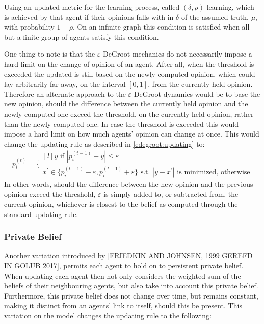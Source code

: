 \documentclass{article}
\newcommand{\beli}[3][2]{p_{#2}^{(#3)}}
\begin{document}
Using an updated metric for the learning process, called $(\delta, \rho)$-learning, which is achieved by that agent if their opinions falls with in $\delta$ of the assumed truth, $\mu$, with probability $1 - \rho$. On an infinite graph this condition is satisfied when all but a finite group of agents satisfy this condition. \newline

One thing to note is that the $\varepsilon$-DeGroot mechanics do not necessarily impose a hard limit on the change of opinion of an agent. After all, when the threshold is exceeded the updated is still based on the newly computed opinion, which could lay arbitrarily far away, on the interval $[0, 1]$, from the currently held opinion. Therefore an alternate approach to the $\varepsilon$-DeGroot dynamics would be to base the new opinion, should the difference between the currently held opinion and the newly computed one exceed the threshold, on the currently held opinion, rather than the 
newly computed one. In case the threshold is exceeded this would impose a hard limit on how much agents' opinion can change at once. This would change the updating rule as described in \ref{edegroot:updating} to:
\begin{equation*}
    \label{edegroot:alt}
    \beli{i}{t} =\Bigg\{
    \begin{matrix*}[l]
        y \text{ if } |\beli{i}{t-1} - y| \leq \varepsilon\\
        x^{\prime}\in\{\beli{i}{t-1}-\varepsilon, \beli{i}{t-1}+\varepsilon\}\text{ s.t. }|y - x^{\prime}|\text{ is minimized, otherwise}
    \end{matrix*}
\end{equation*}
In other words, should the difference between the new opinion and the previous opinion exceed the threshold, $\varepsilon$ is simply added to, or subtracted from, the current opinion, whichever is closest to the belief as computed through the standard updating rule.

\newpage

\subsubsection{Private Belief}

Another variation introduced by [FRIEDKIN AND JOHNSEN, 1999 GEREFD IN GOLUB 2017], permits each agent to hold on to persistent private belief. When updating each agent then not only considers the weighted sum of the beliefs of their neighbouring agents, but also take into account this private belief. Furthermore, this private belief does not change over time, but remains constant, making it distinct from an agents' link to itself, should this be present. This variation on the model changes the updating rule to the following:
\end{document}
